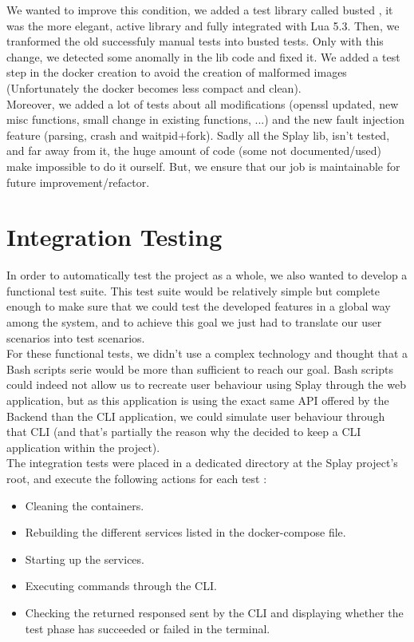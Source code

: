 \documentclass{eplmastersthesis}
\begin{document}
      We wanted to improve this condition, we added a test library called busted \cite{busted}, it was the more elegant,
      active library and fully integrated with Lua 5.3. Then, we tranformed the old successfuly manual tests into busted tests.
      Only with this change, we detected some anomally in the lib code and fixed it. We added a test step in the 
      docker creation to avoid the creation of malformed images (Unfortunately the docker becomes less compact and clean). \\

      Moreover, we added a lot of tests about all modifications (openssl updated, new misc functions, small change in existing functions, ...) 
      and the new fault injection feature (parsing, crash and waitpid+fork). Sadly all the Splay lib, isn't tested, and far away from it,
      the huge amount of code (some not documented/used) make impossible to do it ourself. But, we ensure that our job is 
      maintainable for future improvement/refactor.

    \section{Integration Testing}

      In order to automatically test the project as a whole, we also wanted to
      develop a functional test suite. This test suite would be relatively
      simple but complete enough to make sure that we could test the developed
      features in a global way among the system, and to achieve this goal we
      just had to translate our user scenarios into test scenarios.\\

      For these functional tests, we didn't use a complex technology and
      thought that a Bash scripts serie would be more than sufficient to
      reach our goal. Bash scripts could indeed not allow us to recreate user
      behaviour using Splay through the web application, but as this
      application is using the exact same API offered by the Backend than the
      CLI application, we could simulate user behaviour through that CLI (and
      that's partially the reason why the decided to keep a CLI application
      within the project).\\

      The integration tests were placed in a dedicated directory at the Splay
      project's root, and execute the following actions for each test :

      \begin{itemize}
        \item Cleaning the containers.
        \item Rebuilding the different services listed in the docker-compose
        file.
        \item Starting up the services.
        \item Executing commands through the CLI.
        \item Checking the returned responsed sent by the CLI and displaying
        whether the test phase has succeeded or failed in the terminal.
      \end{itemize}
\end{document}
